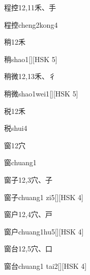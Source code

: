 \begin{entry}{程控}{12,11}{⽲、⼿}
  \begin{phonetics}{程控}{cheng2kong4}
  \end{phonetics}
\end{entry}

\begin{entry}{稍}{12}{⽲}
  \begin{phonetics}{稍}{shao1}[][HSK 5]
  \end{phonetics}
\end{entry}

\begin{entry}{稍微}{12,13}{⽲、⼻}
  \begin{phonetics}{稍微}{shao1wei1}[][HSK 5]
  \end{phonetics}
\end{entry}

\begin{entry}{税}{12}{⽲}
  \begin{phonetics}{税}{shui4}
  \end{phonetics}
\end{entry}

\begin{entry}{窗}{12}{⽳}
  \begin{phonetics}{窗}{chuang1}
  \end{phonetics}
\end{entry}

\begin{entry}{窗子}{12,3}{⽳、⼦}
  \begin{phonetics}{窗子}{chuang1 zi5}[][HSK 4]
  \end{phonetics}
\end{entry}

\begin{entry}{窗户}{12,4}{⽳、⼾}
  \begin{phonetics}{窗户}{chuang1hu5}[][HSK 4]
  \end{phonetics}
\end{entry}

\begin{entry}{窗台}{12,5}{⽳、⼝}
  \begin{phonetics}{窗台}{chuang1 tai2}[][HSK 4]
  \end{phonetics}
\end{entry}

